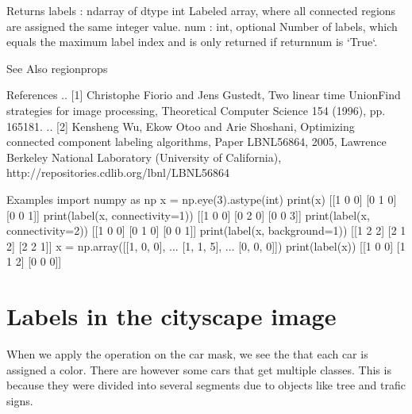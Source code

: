 \documentclass[letterpaper,10pt,english]{sphinxmanual}
\begin{document}
\begin{sphinxVerbatim}[commandchars=\\\{\}]
    Returns
    \PYGZhy{}\PYGZhy{}\PYGZhy{}\PYGZhy{}\PYGZhy{}\PYGZhy{}\PYGZhy{}
    labels : ndarray of dtype int
        Labeled array, where all connected regions are assigned the
        same integer value.
    num : int, optional
        Number of labels, which equals the maximum label index and is only
        returned if return\PYGZus{}num is `True`.
    
    See Also
    \PYGZhy{}\PYGZhy{}\PYGZhy{}\PYGZhy{}\PYGZhy{}\PYGZhy{}\PYGZhy{}\PYGZhy{}
    regionprops
    
    References
    \PYGZhy{}\PYGZhy{}\PYGZhy{}\PYGZhy{}\PYGZhy{}\PYGZhy{}\PYGZhy{}\PYGZhy{}\PYGZhy{}\PYGZhy{}
    .. [1] Christophe Fiorio and Jens Gustedt, \PYGZdq{}Two linear time Union\PYGZhy{}Find
           strategies for image processing\PYGZdq{}, Theoretical Computer Science
           154 (1996), pp. 165\PYGZhy{}181.
    .. [2] Kensheng Wu, Ekow Otoo and Arie Shoshani, \PYGZdq{}Optimizing connected
           component labeling algorithms\PYGZdq{}, Paper LBNL\PYGZhy{}56864, 2005,
           Lawrence Berkeley National Laboratory (University of California),
           http://repositories.cdlib.org/lbnl/LBNL\PYGZhy{}56864
    
    Examples
    \PYGZhy{}\PYGZhy{}\PYGZhy{}\PYGZhy{}\PYGZhy{}\PYGZhy{}\PYGZhy{}\PYGZhy{}
    \PYGZgt{}\PYGZgt{}\PYGZgt{} import numpy as np
    \PYGZgt{}\PYGZgt{}\PYGZgt{} x = np.eye(3).astype(int)
    \PYGZgt{}\PYGZgt{}\PYGZgt{} print(x)
    [[1 0 0]
     [0 1 0]
     [0 0 1]]
    \PYGZgt{}\PYGZgt{}\PYGZgt{} print(label(x, connectivity=1))
    [[1 0 0]
     [0 2 0]
     [0 0 3]]
    \PYGZgt{}\PYGZgt{}\PYGZgt{} print(label(x, connectivity=2))
    [[1 0 0]
     [0 1 0]
     [0 0 1]]
    \PYGZgt{}\PYGZgt{}\PYGZgt{} print(label(x, background=\PYGZhy{}1))
    [[1 2 2]
     [2 1 2]
     [2 2 1]]
    \PYGZgt{}\PYGZgt{}\PYGZgt{} x = np.array([[1, 0, 0],
    ...               [1, 1, 5],
    ...               [0, 0, 0]])
    \PYGZgt{}\PYGZgt{}\PYGZgt{} print(label(x))
    [[1 0 0]
     [1 1 2]
     [0 0 0]]
\end{sphinxVerbatim}


\section{Labels in the cityscape image}
\label{\detokenize{06-ShapeAnalysis:labels-in-the-cityscape-image}}
\sphinxAtStartPar
When we apply the  operation on the car mask, we see the that each car is assigned a color. There are however some cars that get multiple classes. This is because they were divided into several segments due to objects like tree and trafic signs.
\end{document}
